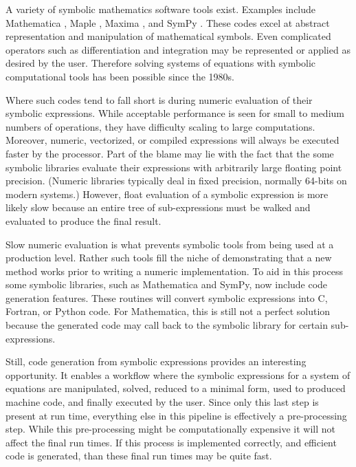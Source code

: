 \documentclass[preprint,12pt]{elsarticle}
\begin{document}
A variety of symbolic mathematics software tools exist. Examples include  
Mathematica \cite{Wolfram2008}, Maple \cite{Maple16},  Maxima \cite{Maxima5}, 
and SymPy \cite{SymPy2012}.  These codes excel at abstract representation and 
manipulation of mathematical symbols.  Even complicated operators such as 
differentiation and integration may be represented or applied as desired by the 
user.  Therefore solving systems of equations with symbolic computational tools
has been possible since the 1980s.

Where such codes tend to fall short is during numeric evaluation of 
their symbolic expressions.  While acceptable performance is seen 
for small to medium numbers of 
operations, they have difficulty scaling to large computations.  Moreover, 
numeric, vectorized, or compiled expressions will always be executed faster
by the processor.  Part of the blame may lie with the fact that the some symbolic 
libraries evaluate their 
expressions with arbitrarily large floating point precision.  (Numeric libraries
typically deal in fixed precision, normally 64-bits on modern systems.)  However, 
float evaluation of a symbolic expression is more likely slow because an entire 
tree of sub-expressions must be walked and evaluated to produce the final result.

Slow numeric evaluation is what prevents symbolic tools from being used at a 
production level.  Rather such tools fill the niche of demonstrating that a new
method works prior to writing a numeric implementation.  To aid in this 
process some symbolic libraries, such as Mathematica and SymPy, now include
code generation features.  These routines will convert symbolic expressions into
C, Fortran, or Python code.  For Mathematica, this is still not a perfect solution
because the generated code may call back to the symbolic library for certain 
sub-expressions.

Still, code generation from symbolic expressions provides an interesting opportunity. 
It enables a workflow 
where the symbolic expressions for a system of equations are manipulated, solved, 
reduced to a minimal form, used to produced machine code, and finally executed by
the user.  Since only this last step is present at run time, everything else in this
pipeline is effectively a pre-processing step.  While this pre-processing might be 
computationally expensive it will not affect the final run times.  If this
process is implemented correctly, and efficient code is generated, than these 
final run times may be quite fast.
\end{document}
